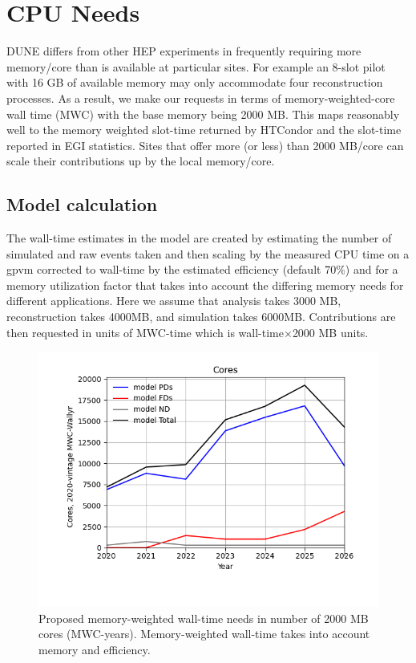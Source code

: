 \documentclass[12pt]{article}
\begin{document}
\clearpage
\section{CPU Needs}


DUNE differs from other HEP experiments in frequently requiring more memory/core than is available at particular sites.  For example an 8-slot pilot with 16 GB of available memory may only accommodate four reconstruction processes.   As a result, we make our requests in terms of memory-weighted-core wall time (MWC)  with the base memory being 2000 MB. This maps reasonably well to the memory weighted slot-time returned by HTCondor and the slot-time reported in EGI statistics.  Sites that offer more  (or less) than 2000 MB/core can scale their contributions up by the local memory/core.

\subsection{Model calculation}
The wall-time estimates in the model are created by estimating the number of simulated and raw events taken and then scaling by the measured CPU time on a gpvm corrected to wall-time by the estimated efficiency (default 70\%) and for a memory utilization factor that takes into account the differing memory needs for different applications. Here we assume that analysis takes 3000 MB, reconstruction takes 4000MB, and simulation takes 6000MB.  Contributions are then requested in units of MWC-time which is wall-time$\times$2000 MB units. 


\begin{figure}[h]
\centering\includegraphics[height=0.4\textwidth]{MoreSim_2022-12-04-2026/MoreSim_2022-12-04-2026-Cores.png}
\caption{Proposed memory-weighted wall-time needs in number of 2000 MB cores (MWC-years). Memory-weighted  wall-time takes into account memory and efficiency.}\label{fig:CoresMain}
\end{figure}
\end{document}
